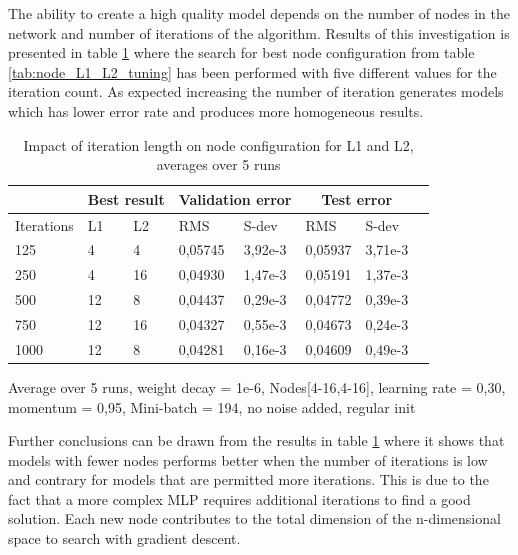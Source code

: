 The ability to create a high quality model depends on the number of nodes in the network and number of iterations of the algorithm. Results of this investigation is presented in table \ref{tab:node_L1_L2_tuning_iters} where the search for best node configuration from table \ref{tab:node_L1_L2_tuning} has been performed with five different values for the iteration count. As expected increasing the number of iteration generates models which has lower error rate and produces more homogeneous results.  


\begin{table}[H]
\begin{threeparttable}
\begin{tabular}{ | l | p{0.7cm} | p{0.7cm} | l | p{1.3cm} | p{1.3cm} | p{1.3cm} | p{1.3cm} | } 
\hline 
\multicolumn{1}{|c|}{} & \multicolumn{2}{|c|}{Best result} & \multicolumn{2}{|c|}{Validation error}  & \multicolumn{2}{|c|}{Test error} \\
\hline 
Iterations & L1 & L2 & RMS & S-dev & RMS & S-dev \\
\hline
125 & 4 & 4 & 0,05745 & 3,92e-3 & 0,05937 & 3,71e-3 \\
\hline
250 & 4 & 16 & 0,04930 & 1,47e-3 & 0,05191 & 1,37e-3 \\
\hline
500 & 12 & 8 & 0,04437 & 0,29e-3 & 0,04772 & 0,39e-3 \\
\hline
750 & 12 & 16 & 0,04327 & 0,55e-3 & 0,04673 & 0,24e-3 \\
\hline
1000 & 12 & 8 & 0,04281 & 0,16e-3 & 0,04609 & 0,49e-3 \\
\hline
\end{tabular}
\begin{tablenotes}
      \small
      \item Average over 5 runs, weight decay = 1e-6, Nodes[4-16,4-16], learning rate = 0,30, momentum = 0,95, Mini-batch = 194, no noise added, regular init 
\end{tablenotes}
\caption{Impact of iteration length on node configuration for L1 and L2, averages over 5 runs}
\label{tab:node_L1_L2_tuning_iters}
\end{threeparttable}
\end{table}

Further conclusions can be drawn from the results in table \ref{tab:node_L1_L2_tuning_iters} where it shows that models with fewer nodes performs better when the number of iterations is low and contrary for models that are permitted more iterations. This is due to the fact that a more complex MLP requires additional iterations to find a good solution. Each new node contributes to the total dimension of the n-dimensional space to search with gradient descent. 

